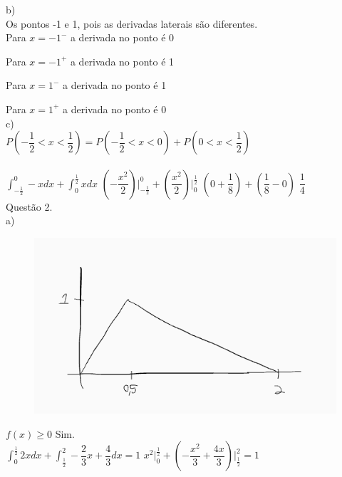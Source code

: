 \documentclass[12pt]{article}
\begin{document}
\noindent b)\\

Os pontos -1 e 1, pois as derivadas laterais são diferentes.\\

Para $x=-1^{-}$ a derivada no ponto é 0

Para $x=-1^{+}$ a derivada no ponto é 1

Para $x=1^{-}$ a derivada no ponto é 1
 
Para $x=1^{+}$ a derivada no ponto é 0\\

\noindent c)\\

$P\left(-\dfrac{1}{2}<x<\dfrac{1}{2}\right)=P\left(-\dfrac{1}{2}<x<0\right)+P\left(0<x<\dfrac{1}{2}\right)$\\\\

$\displaystyle\int_{-\frac{1}{2}}^{0}-xdx+\int_{0}^{\frac{1}{2}}xdx$\qquad\qquad
$\left(-\dfrac{x^{2}}{2}\right)\biggr|^{0}_{-\frac{1}{2}}+\left(\dfrac{x^{2}}{2}\right)\biggr|^{\frac{1}{2}}_{0}$\qquad\qquad
$\left(0+\dfrac{1}{8}\right)+\left(\dfrac{1}{8}-0\right)$\qquad\qquad
$\dfrac{1}{4}$\\  

\noindent Questão 2.\\

\noindent a)\\

\begin{figure}[h!]
	\includegraphics[scale=0.7]{q2}
\end{figure}

$f(x)\geq0$ Sim.\\

$\displaystyle\int_{0}^{\frac{1}{2}}2xdx+\int_{\frac{1}{2}}^{2}-\dfrac{2}{3}x+\dfrac{4}{3}dx=1$\qquad\qquad
$x^{2}\biggr|^{\frac{1}{2}}_{0}+\left(-\dfrac{x^{2}}{3}+\dfrac{4x}{3}\right)\biggr|^{2}_{\frac{1}{2}}=1$\\\\
\end{document}
